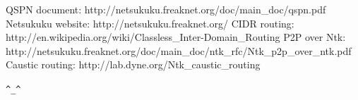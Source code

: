 \documentclass[a4paper]{article}
\newcommand{\href}[2]{ #1 }
\begin{document}
\begin{thebibliography}{99}
	 QSPN document:
		\href{http://netsukuku.freaknet.org/doc/main\_doc/qspn.pdf}{qspn.pdf}
	 Netsukuku website:
		\href{http://netsukuku.freaknet.org/}{http://netsukuku.freaknet.org/}
	 CIDR routing:
		\href{http://en.wikipedia.org/wiki/Classless\_Inter-Domain\_Routing}{Classless\_Inter-Domain\_Routing in Wikipedia}
	 P2P over Ntk:
		\href{http://netsukuku.freaknet.org/doc/main\_doc/ntk\_rfc/Ntk\_p2p\_over\_ntk.pdf}{P2P over Ntk}
	 Caustic routing:
		\href{http://lab.dyne.org/Ntk\_caustic\_routing}{RFC 0013}
\end{thebibliography}
\newpage

\begin{center}
\verb|^_^|
\end{center}
\end{document}
